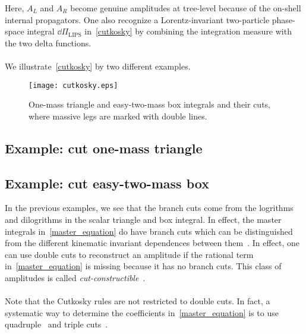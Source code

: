 Here, $A_L$ and $A_R$ become genuine amplitudes at tree-level because of the on-shell internal propagators. 
One also recognize a Lorentz-invariant two-particle phase-space integral $\dd\Pi_{\mathrm{LIPS}}$ in~\cref{cutkosky} by combining the integration measure with the two delta functions.
\\\\
We illustrate~\cref{cutkosky} by two different examples.
%
%
\begin{figure}[h]
  \centering
  \texttt{[image: cutkosky.eps]}
  \caption{One-mass triangle and easy-two-mass box integrals and their cuts, where massive legs are marked with double lines.}
  \label{fig-cutkosky}
\end{figure}
\subsection*{Example: cut one-mass triangle}

\subsection*{Example: cut easy-two-mass box}


%
In the previous examples, we see that the branch cuts come from the logrithms and dilogrithms in the scalar triangle and box integral. 
In effect, the master integrals in~\cref{master_equation} do have branch cuts which can be distinguished from the different kinematic invariant dependences between them~\cite{Bern:1993kr}.
In effect, one can use double cuts to reconstruct an amplitude if the rational term in~\cref{master_equation} is missing because it has no branch cuts.
This class of amplitudes is called \textit{cut-constructible}~\cite{Bern:1994cg}. 
\\\\
Note that the Cutkosky rules are not restricted to double cuts. 
In fact, a systematic way to determine the coefficients in~\cref{master_equation} is to use quadruple~\cite{BRITTO2005499} and triple cuts~\cite{Forde:2007mi}.